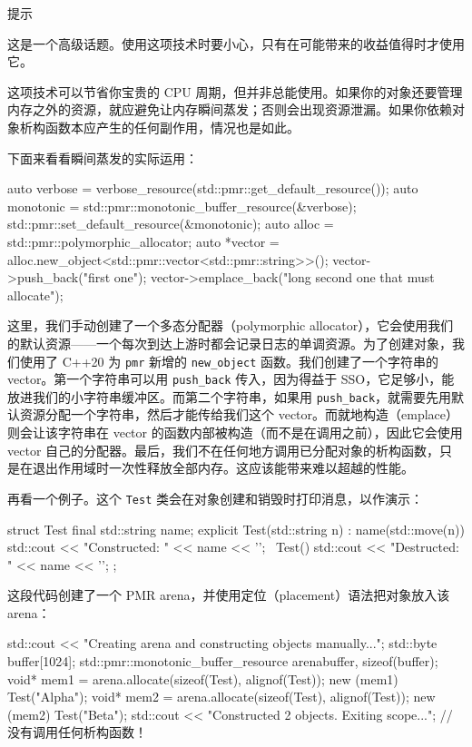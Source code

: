 \begin{myTip}{提示}

这是一个高级话题。使用这项技术时要小心，只有在可能带来的收益值得时才使用它。
\end{myTip}

\label{idx:627}
这项技术可以节省你宝贵的 CPU 周期，但并非总能使用。如果你的对象还要管理内存之外的资源，就应避免让内存瞬间蒸发；否则会出现资源泄漏。如果你依赖对象析构函数本应产生的任何副作用，情况也是如此。

下面来看看瞬间蒸发的实际运用：

\begin{codebox}[cpp]
auto verbose = verbose_resource(std::pmr::get_default_resource());
auto monotonic = std::pmr::monotonic_buffer_resource(&verbose);
std::pmr::set_default_resource(&monotonic);
auto alloc = std::pmr::polymorphic_allocator{};
auto *vector = alloc.new_object<std::pmr::vector<std::pmr::string>>();
vector->push_back("first one");
vector->emplace_back("long second one that must allocate");
\end{codebox}

\label{idx:628}
这里，我们手动创建了一个多态分配器（polymorphic allocator），它会使用我们的默认资源——一个每次到达上游时都会记录日志的单调资源。为了创建对象，我们使用了 C++20 为 \texttt{pmr} 新增的 \texttt{new\_\allowbreak{}object} 函数。我们创建了一个字符串的 vector。第一个字符串可以用 \texttt{push\_\allowbreak{}back} 传入，因为得益于 SSO，它足够小，能放进我们的小字符串缓冲区。而第二个字符串，如果用 \texttt{push\_\allowbreak{}back}，就需要先用默认资源分配一个字符串，然后才能传给我们这个 vector。而就地构造（emplace）则会让该字符串在 vector 的函数内部被构造（而不是在调用之前），因此它会使用 vector 自己的分配器。最后，我们不在任何地方调用已分配对象的析构函数，只是在退出作用域时一次性释放全部内存。这应该能带来难以超越的性能。

\label{idx:629}
\label{idx:630}
再看一个例子。这个 \texttt{Test} 类会在对象创建和销毁时打印消息，以作演示：

\begin{codebox}[cpp]
struct Test final {
    std::string name;
    explicit Test(std::string n) : name(std::move(n)) {
        std::cout << "Constructed: " << name << '\n';
    }
    ~Test() {
        std::cout << "Destructed: " << name << '\n';
    }
};
\end{codebox}

这段代码创建了一个 PMR arena，并使用定位（placement）语法把对象放入该 arena：

\begin{codebox}[cpp]
std::cout << "Creating arena and constructing objects manually...\n";
std::byte buffer[1024];
std::pmr::monotonic_buffer_resource arena{buffer, sizeof(buffer)};
void* mem1 = arena.allocate(sizeof(Test), alignof(Test));
new (mem1) Test("Alpha");
void* mem2 = arena.allocate(sizeof(Test), alignof(Test));
new (mem2) Test("Beta");
std::cout << "Constructed 2 objects. Exiting scope...\n";
//没有调用任何析构函数！
\end{codebox}

